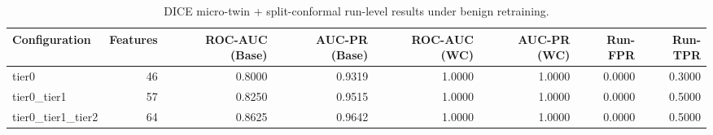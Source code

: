 \begin{table}[t]
\centering
\caption{DICE micro-twin + split-conformal run-level results under benign retraining.}
\label{tab:dice_full_overall}
\footnotesize
\begin{tabular}{lrrrrrrr}
\toprule
Configuration & Features & ROC-AUC (Base) & AUC-PR (Base) & ROC-AUC (WC) & AUC-PR (WC) & Run-FPR & Run-TPR \\
\midrule
tier0 & 46 & 0.8000 & 0.9319 & 1.0000 & 1.0000 & 0.0000 & 0.3000 \\
tier0_tier1 & 57 & 0.8250 & 0.9515 & 1.0000 & 1.0000 & 0.0000 & 0.5000 \\
tier0_tier1_tier2 & 64 & 0.8625 & 0.9642 & 1.0000 & 1.0000 & 0.0000 & 0.5000 \\
\bottomrule
\end{tabular}

\end{table}
